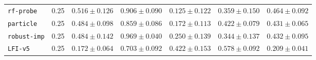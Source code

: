 \documentclass{article}
\begin{document}
\begin{center}
{\begin{tabular}{llccccc}
\texttt{rf-probe} & 0.25 & $0.516 \pm 0.126$ & $0.906 \pm 0.090$ & $0.125 \pm 0.122$ & $0.359 \pm 0.150$ & $0.464 \pm 0.092$ \\
\texttt{particle} & 0.25 & $0.484 \pm 0.098$ & $0.859 \pm 0.086$ & $0.172 \pm 0.113$ & $0.422 \pm 0.079$ & $0.431 \pm 0.065$ \\
\texttt{robust-imp} & 0.25 & $0.484 \pm 0.142$ & $0.969 \pm 0.040$ & $0.250 \pm 0.139$ & $0.344 \pm 0.137$ & $0.432 \pm 0.095$ \\
\texttt{LFI-v5} & 0.25 & $0.172 \pm 0.064$ & $0.703 \pm 0.092$ & $0.422 \pm 0.153$ & $0.578 \pm 0.092$ & $0.209 \pm 0.041$ \\
\bottomrule
\end{tabular}%
}
\end{center}
\normalsize

\scriptsize
\setlength{\tabcolsep}{2pt}
\end{document}
